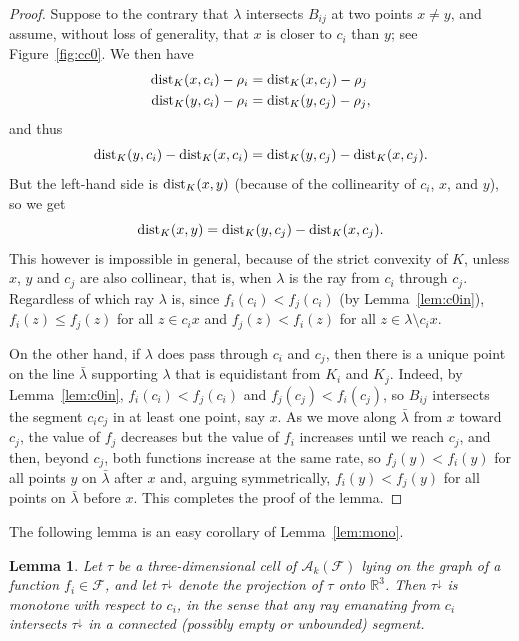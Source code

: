 \documentclass[11pt]{article}
\def\reals{{\mathbb R}}
\def\dist{{\rm dist}}
\def\A{\mathcal{A}}
\def\F{\mathcal{F}}
\newtheorem{lemma}[theorem]{Lemma}
\theoremstyle{definition}
\begin{document}
\begin{proof}
Suppose to the contrary that $\lambda$ intersects $B_{ij}$ at 
two points $x\ne y$, and assume, without loss of generality, that $x$ is closer to 
$c_i$ than $y$; see Figure~\ref{fig:cc0}. We then have
\begin{align*}
\dist_K(x,c_i) - \rho_i & = \dist_K(x,c_j) - \rho_j \\
\dist_K(y,c_i) - \rho_i & = \dist_K(y,c_j) - \rho_j ,
\end{align*}
and thus
\[
\dist_K(y,c_i) - \dist_K(x,c_i) = \dist_K(y,c_j) - \dist_K(x,c_j) .
\]
But the left-hand side is $\dist_K(x,y)$ (because of the collinearity of $c_i$, $x$, and $y$), so we get
\[
\dist_K(x,y) = \dist_K(y,c_j) - \dist_K(x,c_j) .
\]
This however is impossible in general, because of the strict convexity of $K$, unless $x$, $y$ and $c_j$ 
are also collinear, that is, when $\lambda$ is the ray from $c_i$ through $c_j$. 
Regardless of which ray $\lambda$ is, since $f_i(c_i) < f_j(c_i)$ (by Lemma~\ref{lem:c0in}), 
$f_i(z) \le f_j(z)$ for all $z\in c_i x$ and $f_j (z) < f_i(z)$ for all $z\in\lambda\setminus c_ix$.

On the other hand, if $\lambda$ does pass through $c_i$ and $c_j$, then there is a unique point 
on the line $\bar\lambda$ supporting $\lambda$ that is equidistant from $K_i$ and $K_j$. 
	Indeed, by Lemma~\ref{lem:c0in}, $f_i(c_i) < f_j(c_i)$ and $f_j(c_j) < f_i(c_j)$,
so $B_{ij}$ intersects the segment $c_ic_j$ in at least one point, say $x$. As we 
move along $\bar\lambda$ from  $x$ toward $c_j$, the value of $f_j$ decreases but the value of 
$f_i$ increases until we reach $c_j$, and then, beyond $c_j$, both functions increase at the 
same rate, so $f_j(y)< f_i(y)$ for all points $y$ on $\bar\lambda$ after $x$ and, arguing symmetrically, 
$f_i(y)<f_j(y)$ for all points on $\bar\lambda$ before $x$. This completes the proof of the lemma.
\end{proof}

The following lemma is an easy corollary of Lemma~\ref{lem:mono}.
\begin{lemma}
	\label{lem:star} 
	Let $\tau$ be a three-dimensional cell of $\A_{k}(\F)$
	lying on the graph of a function $f_i\in\F$, and let $\tau^\downarrow$ 
	denote the projection of $\tau$ onto $\reals^3$.  Then $\tau^\downarrow$ is 
	monotone with respect to $c_i$, in the sense that any ray emanating from 
	$c_i$ intersects $\tau^\downarrow$ in a connected (possibly empty or 
	unbounded) segment.
\end{lemma}
\fi
\end{document}
